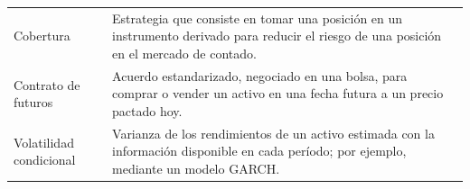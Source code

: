 {\begin{tabular}{@{}p{4cm}p{\dimexpr\textwidth-4cm-2\tabcolsep}@{}}
Cobertura & Estrategia que consiste en tomar una posición en un instrumento derivado para reducir el riesgo de una posición en el mercado de contado.\\[4pt]
Contrato de futuros & Acuerdo estandarizado, negociado en una bolsa, para comprar o vender un activo en una fecha futura a un precio pactado hoy.\\[4pt]
Volatilidad condicional & Varianza de los rendimientos de un activo estimada con la información disponible en cada período; por ejemplo, mediante un modelo GARCH.\\
\end{tabular}\par}
